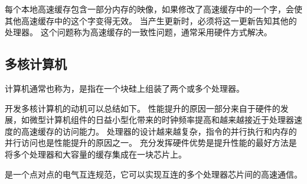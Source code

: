 {{        每个本地高速缓存包含一部分内存的映像，如果修改了高速缓存中的一个字，会使其他高速缓存中的这个字变得无效。
        当产生更新时，必须将这一更新告知其他的处理器。
        这个问题称为高速缓存的一致性问题，通常采用硬件方式解决。
    }

    \subsection{多核计算机}
    {
        计算机通常也称为，是指在一个块硅上组装了两个或多个处理器。

        开发多核计算机的动机可以总结如下。
        性能提升的原因一部分来自于硬件的发展，如微型计算机组件的日益小型化带来的时钟频率提高和越来越接近于处理器速度的高速缓存的访问能力。
        处理器的设计越来越复杂，指令的并行执行和内存的并行访问也是性能提升的原因之一。
        充分发挥硬件优势是提升性能的最好方法是将多个处理器和大容量的缓存集成在一块芯片上。

        是一个点对点的电气互连规范，它可以实现互连的多个处理器芯片间的高速通信。
    }
}
